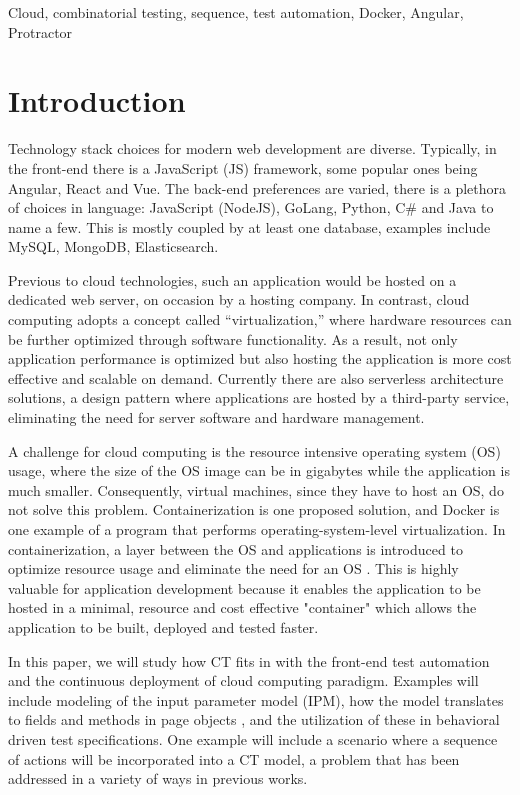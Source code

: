 \documentclass[conference]{IEEEtran}
\begin{document}
\begin{IEEEkeywords}
Cloud, combinatorial testing, sequence, test automation, Docker, Angular, Protractor
\end{IEEEkeywords}

\section{Introduction}
Technology stack choices for modern web development are diverse. 
Typically, in the front-end there is a JavaScript (JS) framework, some popular ones being Angular, React and Vue.
The back-end preferences are varied, there is a plethora of choices in language: JavaScript (NodeJS), GoLang, Python, C\# and Java to name a few. 
This is mostly coupled by at least one database, examples include MySQL, MongoDB, Elasticsearch.

Previous to cloud technologies, such an application would be hosted on a dedicated web server, on occasion by a hosting company.
In contrast, cloud computing adopts a concept called “virtualization,” where hardware resources can be further optimized through software functionality.
As a result, not only application performance is optimized but also hosting the application is more cost effective and scalable on demand.
Currently there are also serverless architecture solutions, a design pattern where applications are hosted by a third-party service, eliminating the need for server software and hardware management.

A challenge for cloud computing is the resource intensive operating system (OS) usage, where the size of the OS image can be in gigabytes while the application is much smaller. 
Consequently, virtual machines, since they have to host an OS, do not solve this problem.
Containerization is one proposed solution, and Docker is one example of a program that performs operating-system-level virtualization. 
In containerization, a layer between the OS and applications is introduced to optimize resource usage and eliminate the need for an OS \cite{wiki:docker}.
This is highly valuable for application development because it enables the application to be hosted in a minimal, resource and cost effective "container" which 
allows the application to be built, deployed and tested faster.

In this paper, we will study how CT fits in with the front-end test automation and the continuous deployment of cloud computing paradigm.
Examples will include modeling of the input parameter model (IPM), how the model translates to fields and methods in page objects \cite{fowler:pageobject}, 
and the utilization of these in behavioral driven test specifications.
One example will include a scenario where a sequence of actions will be incorporated into a CT model, a problem that has been addressed in a variety of ways in previous works.
\end{document}
